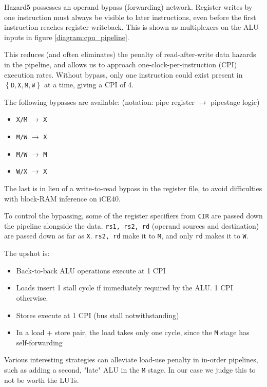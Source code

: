 \documentclass[notitlepage]{article}
\begin{document}
Hazard5 possesses an operand bypass (forwarding) network. Register writes by one instruction must always be visible to later instructions, even before the first instruction reaches register writeback. This is shown as multiplexers on the ALU inputs in figure \ref{diagram:cpu_pipeline}.

This reduces (and often eliminates) the penalty of read-after-write data hazards in the pipeline, and allows us to approach one-clock-per-instruction (CPI) execution rates. Without bypass, only one instruction could exist present in $\left\{ \texttt{D}, \texttt{X}, \texttt{M}, \texttt{W} \right\}$ at a time, giving a CPI of 4.

The following bypasses are available: (notation: pipe register $\to$ pipestage logic)

\begin{itemize}
	\item \texttt{X/M} $\to$ \texttt{X}
	\item \texttt{M/W} $\to$ \texttt{X}
	\item \texttt{M/W} $\to$ \texttt{M}
	\item \texttt{W/X} $\to$ \texttt{X}
\end{itemize}

The last is in lieu of a write-to-read bypass in the register file, to avoid difficulties with block-RAM inference on iCE40.

To control the bypassing, some of the register specifiers from \texttt{CIR} are passed down the pipeline alongside the data. \texttt{rs1, rs2, rd} (operand sources and destination) are passed down as far as \texttt{X}. \texttt{rs2, rd} make it to \texttt{M}, and only \texttt{rd} makes it to \texttt{W}.

The upshot is:

\begin{itemize}
	\item Back-to-back ALU operations execute at 1 CPI
	\item Loads insert 1 stall cycle if immediately required by the ALU. 1 CPI otherwise.
	\item Stores execute at 1 CPI (bus stall notwithstanding)
	\item In a load + store pair, the load takes only one cycle, since the \texttt{M} stage has self-forwarding
\end{itemize}

Various interesting strategies can alleviate load-use penalty in in-order pipelines, such as adding a second, "late" ALU in the \texttt{M} stage. In our case we judge this to not be worth the LUTs.
\end{document}
